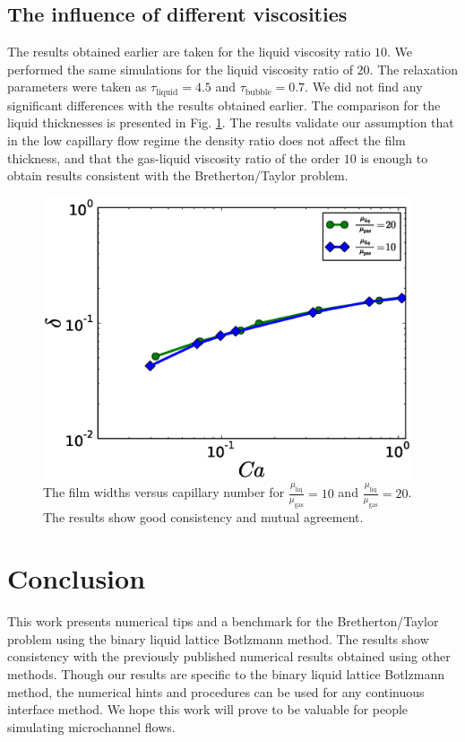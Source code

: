 \documentclass{article}
\begin{document}
\subsection{The influence of different viscosities}
The results obtained earlier are taken for the liquid viscosity ratio $10$.
We performed the same simulations for the liquid viscosity ratio of $20$.
The relaxation parameters were taken as $\tau_{\mathrm{liquid}}=4.5$ and $\tau_{\mathrm{bubble}}=0.7$. We
did not find any significant differences with the results obtained earlier. The
comparison for the liquid thicknesses is presented in Fig.
\ref{fig:capillary:viscous}. The results validate our assumption that in
the low capillary flow regime the density ratio does not affect the film thickness,
and that the gas-liquid viscosity ratio of the order $10$ is enough to obtain results
consistent with the Bretherton/Taylor problem.
\begin{figure}
\includegraphics[width=0.97\textwidth]{Figures/Capillary_Viscous/capillaries_viscous.eps}
\caption{The film widths versus capillary number for
$\frac{\mu_{\mathrm{liq}}}{\mu_{\mathrm{gas}}}=10$ and $\frac{\mu_{\mathrm{liq}}}{\mu_{\mathrm{gas}}}=20$. The
results show good consistency and mutual agreement.\label{fig:capillary:viscous}}
\end{figure}

\section{Conclusion}
This work presents numerical tips and a benchmark for the
Bretherton/Taylor problem using the binary liquid lattice Botlzmann method. The
results show consistency with the previously published numerical results obtained
using other methods. Though our results are specific to the binary liquid lattice
Botlzmann method, the numerical hints and procedures can be used for any
continuous interface method.  We hope this work will prove to be valuable for
people simulating microchannel flows.



\end{document}
